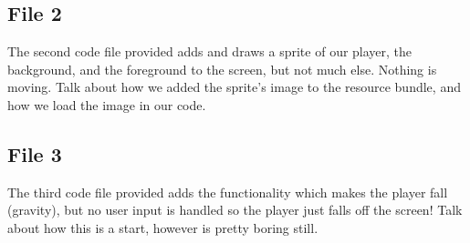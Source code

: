 \documentclass[12pt]{article}
\begin{document}
\subsection*{File 2}
The second code file provided adds and draws a sprite of our player, the background, and the foreground to the screen, but not much else. Nothing is moving.
Talk about how we added the sprite's image to the resource bundle, and how we load the image in our code.

\newpage

\subsection*{File 3}
The third code file provided adds the functionality which makes the player fall (gravity), but no user input is handled so the player just falls off the screen!
Talk about how this is a start, however is pretty boring still.
\end{document}
